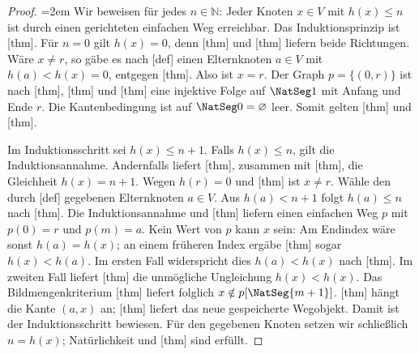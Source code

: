 \begin{proof}
\emergencystretch=2em
Wir beweisen für jedes \(n\in\mathbb N\): Jeder Knoten \(x\in V\)
mit \(h(x)\leq n\) ist durch einen gerichteten einfachen Weg erreichbar.
Das Induktionsprinzip ist [thm].
Für \(n=0\) gilt \(h(x)=0\), denn
[thm] und
[thm] liefern beide Richtungen.
Wäre \(x\ne r\), so gäbe es nach
[def] einen Elternknoten
\(a\in V\) mit \(h(a)<h(x)=0\), entgegen
[thm]. Also ist \(x=r\).
Der Graph \(p=\{(0,r)\}\) ist nach
[thm],
[thm] und
[thm] eine injektive Folge auf
\(\NatSeg1\) mit Anfang und Ende \(r\). Die Kantenbedingung ist auf
\(\NatSeg0=\varnothing\) leer. Somit gelten
[thm] und
[thm].

Im Induktionsschritt sei \(h(x)\leq n+1\). Falls \(h(x)\leq n\),
gilt die Induktionsannahme. Andernfalls liefert
[thm], zusammen mit
[thm], die Gleichheit \(h(x)=n+1\).
Wegen \(h(r)=0\) und [thm] ist
\(x\ne r\). Wähle den durch
[def] gegebenen Elternknoten
\(a\in V\). Aus \(h(a)<n+1\) folgt \(h(a)\leq n\) nach
[thm]. Die Induktionsannahme und
[thm] liefern einen
einfachen Weg \(p\) mit \(p(0)=r\) und \(p(m)=a\).
Kein Wert von \(p\) kann \(x\) sein: Am Endindex wäre sonst
\(h(a)=h(x)\); an einem früheren Index ergäbe
[thm] sogar \(h(x)<h(a)\).
Im ersten Fall widerspricht dies \(h(a)<h(x)\) nach
[thm]. Im zweiten Fall
liefert [thm] die unmögliche
Ungleichung \(h(x)<h(x)\).
Das Bildmengenkriterium
[thm]
liefert folglich \(x\notin p[\NatSeg{m+1}]\).
[thm] hängt die Kante
\((a,x)\) an; [thm]
liefert das neue gespeicherte Wegobjekt. Damit ist der Induktionsschritt
bewiesen. Für den gegebenen Knoten setzen wir schließlich \(n=h(x)\);
Natürlichkeit und [thm] sind erfüllt.
\end{proof}

